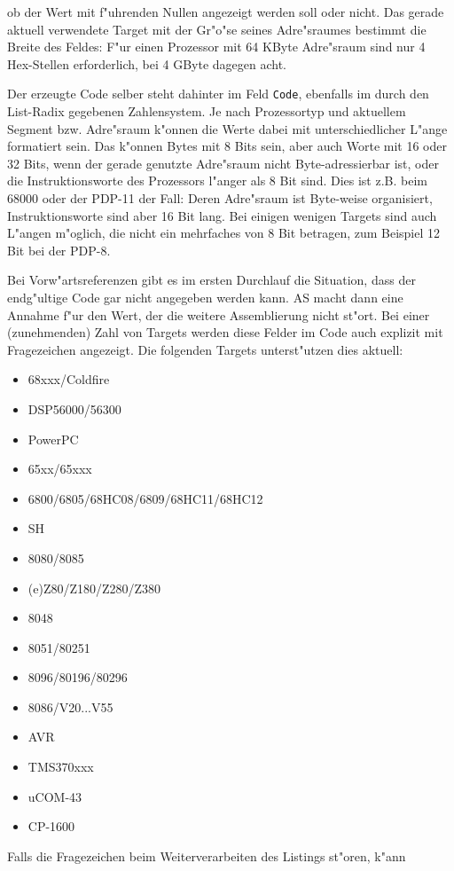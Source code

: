 \documentclass[12pt,a4paper,twoside]{report}
\newcommand{\tty}[1]{{\tt #1}}
\newcommand{\asname}{AS}
\begin{document}
ob der Wert mit f"uhrenden Nullen angezeigt werden soll oder nicht.  Das
gerade aktuell verwendete Target mit der Gr"o"se seines Adre"sraumes bestimmt
die Breite des Feldes: F"ur einen Prozessor mit 64 KByte Adre"sraum sind
nur 4 Hex-Stellen erforderlich, bei 4 GByte dagegen acht.
\par
Der erzeugte Code selber steht dahinter im Feld \tty{Code}, ebenfalls
im durch den List-Radix gegebenen Zahlensystem.  Je nach Prozessortyp und
aktuellem Segment bzw. Adre"sraum k"onnen die Werte dabei mit unterschiedlicher
L"ange formatiert sein.  Das k"onnen Bytes mit 8 Bits sein, aber auch Worte
mit 16 oder 32 Bits, wenn der gerade genutzte Adre"sraum nicht Byte-adressierbar
ist, oder die Instruktionsworte des Prozessors l"anger als 8 Bit sind.  Dies
ist z.B. beim 68000 oder der PDP-11 der Fall: Deren Adre"sraum ist Byte-weise
organisiert, Instruktionsworte sind aber 16 Bit lang.  Bei einigen wenigen
Targets sind auch L"angen m"oglich, die nicht ein mehrfaches von 8 Bit betragen,
zum Beispiel 12 Bit bei der PDP-8.
\par
Bei Vorw"artsreferenzen gibt es im ersten Durchlauf die Situation, dass der
endg"ultige Code gar nicht angegeben werden kann. \asname{} macht dann eine
Annahme f"ur den Wert, der die weitere Assemblierung nicht st"ort.  Bei einer
(zunehmenden) Zahl von Targets werden diese Felder im Code auch explizit
mit Fragezeichen angezeigt.  Die folgenden Targets unterst"utzen dies aktuell:
\begin{itemize}
\item{68xxx/Coldfire}
\item{DSP56000/56300}
\item{PowerPC}
\item{65xx/65xxx}
\item{6800/6805/68HC08/6809/68HC11/68HC12}
\item{SH}
\item{8080/8085}
\item{(e)Z80/Z180/Z280/Z380}
\item{8048}
\item{8051/80251}
\item{8096/80196/80296}
\item{8086/V20...V55}
\item{AVR}
\item{TMS370xxx}
\item{uCOM-43}
\item{CP-1600}
\end{itemize}
Falls die Fragezeichen beim Weiterverarbeiten des Listings st"oren, k"ann
\end{document}

